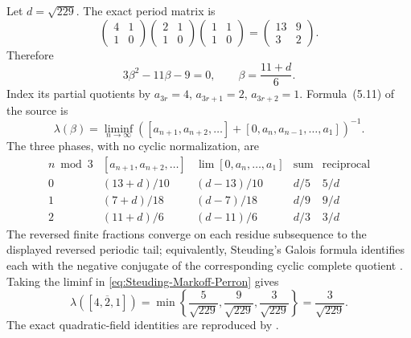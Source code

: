 \begin{calculation}
\label{calc:Steuding-522-Markoff}
Let $d=\sqrt{229}$.  The exact period matrix is
\[
 \begin{pmatrix}4&1\\1&0\end{pmatrix}
 \begin{pmatrix}2&1\\1&0\end{pmatrix}
 \begin{pmatrix}1&1\\1&0\end{pmatrix}
 =\begin{pmatrix}13&9\\3&2\end{pmatrix}.
\]
Therefore
\begin{equation}
\label{eq:Steuding-beta-quadratic}
 3\beta^2-11\beta-9=0,
 \qquad
 \beta=\frac{11+d}{6}.
\end{equation}
Index its partial quotients by $a_{3r}=4$, $a_{3r+1}=2$,
$a_{3r+2}=1$.  Formula~(5.11) of the source is
\begin{equation}
\label{eq:Steuding-Markoff-Perron}
 \lambda(\beta)=\liminf_{n\to\infty}
 \left(
  [a_{n+1},a_{n+2},\ldots]
  +[0,a_n,a_{n-1},\ldots,a_1]
 \right)^{-1}.
\end{equation}
The three phases, with no cyclic normalization, are
\[
\begin{array}{c|c|c|c|c}
n\bmod3 & [a_{n+1},a_{n+2},\ldots]
 & \displaystyle\lim[0,a_n,\ldots,a_1]
 & \text{sum} & \text{reciprocal}\\ \hline
0 & (13+d)/10 & (d-13)/10 & d/5 & 5/d\\
1 & (7+d)/18  & (d-7)/18  & d/9 & 9/d\\
2 & (11+d)/6  & (d-11)/6  & d/3 & 3/d
\end{array}
\]
The reversed finite fractions converge on each residue subsequence to the
displayed reversed periodic tail; equivalently, Steuding's Galois formula
identifies each with the negative conjugate of the corresponding cyclic
complete quotient \cite[Thm.~5.3 and Eq.~(5.11)]{Steuding2005}.  Taking the
liminf in \eqref{eq:Steuding-Markoff-Perron} gives
\begin{equation}
\label{eq:Steuding-Markoff-value}
 \boxed{\lambda([\overline{4,2,1}])
 =\min\left\{\frac5{\sqrt{229}},\frac9{\sqrt{229}},
                    \frac3{\sqrt{229}}\right\}
 =\frac3{\sqrt{229}}.}
\end{equation}
The exact quadratic-field identities are reproduced by
.
\end{calculation}

